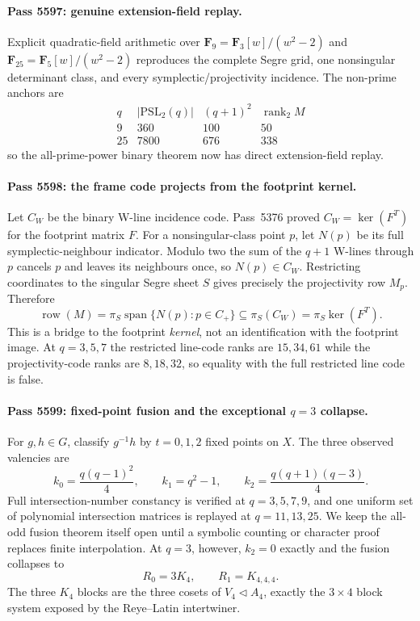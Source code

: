 \paragraph{Pass 5597: genuine extension-field replay.}
Explicit quadratic-field arithmetic over
$\mathbf F_9=\mathbf F_3[w]/(w^2-2)$ and
$\mathbf F_{25}=\mathbf F_5[w]/(w^2-2)$ reproduces the complete Segre grid,
one nonsingular determinant class, and every symplectic/projectivity incidence.
The non-prime anchors are
\[
\begin{array}{c|c|c|c}
q&|\mathrm{PSL}_2(q)|&(q+1)^2&\operatorname{rank}_2M\\\hline
9&360&100&50\\
25&7800&676&338
\end{array}
\]
so the all-prime-power binary theorem now has direct extension-field replay.

\paragraph{Pass 5598: the frame code projects from the footprint kernel.}
Let $C_W$ be the binary W-line incidence code.  Pass~5376 proved
$C_W=\ker(F^T)$ for the footprint matrix $F$.  For a nonsingular-class point
$p$, let $N(p)$ be its full symplectic-neighbour indicator.  Modulo two the sum
of the $q+1$ W-lines through $p$ cancels $p$ and leaves its neighbours once, so
$N(p)\in C_W$.  Restricting coordinates to the singular Segre sheet $S$ gives
precisely the projectivity row $M_p$.  Therefore
\[
\boxed{\operatorname{row}(M)
 =\pi_S\operatorname{span}\{N(p):p\in C_+\}
 \subseteq\pi_S(C_W)=\pi_S\ker(F^T).}
\]
This is a bridge to the footprint \emph{kernel}, not an identification with the
footprint image.  At $q=3,5,7$ the restricted line-code ranks are $15,34,61$
while the projectivity-code ranks are $8,18,32$, so equality with the full
restricted line code is false.

\paragraph{Pass 5599: fixed-point fusion and the exceptional $q=3$ collapse.}
For $g,h\in G$, classify $g^{-1}h$ by $t=0,1,2$ fixed points on $X$.  The
three observed valencies are
\[
\boxed{k_0=\frac{q(q-1)^2}{4}},\qquad
\boxed{k_1=q^2-1},\qquad
\boxed{k_2=\frac{q(q+1)(q-3)}{4}}.
\]
Full intersection-number constancy is verified at $q=3,5,7,9$, and one uniform
set of polynomial intersection matrices is replayed at $q=11,13,25$.  We keep
the all-odd fusion theorem itself open until a symbolic counting or character
proof replaces finite interpolation.  At $q=3$, however, $k_2=0$ exactly and
the fusion collapses to
\[
\boxed{R_0=3K_4,\qquad R_1=K_{4,4,4}.}
\]
The three $K_4$ blocks are the three cosets of $V_4\triangleleft A_4$, exactly
the $3\times4$ block system exposed by the Reye--Latin intertwiner.

